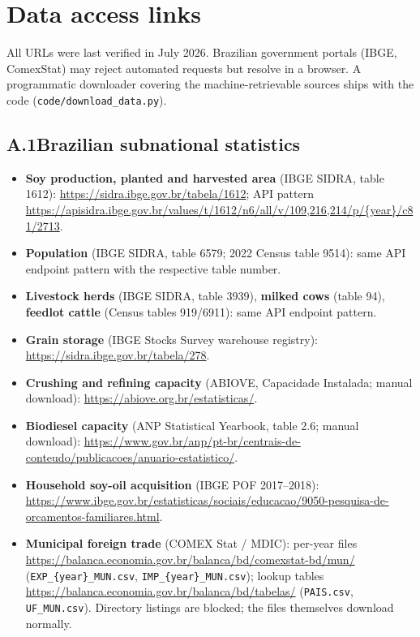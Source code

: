 
\section{Data access links}\label{app:links}

All URLs were last verified in July 2026. Brazilian government portals
(IBGE, ComexStat) may reject automated requests but resolve in a browser.
A programmatic downloader covering the machine-retrievable sources ships
with the code (\texttt{code/download\_data.py}).

\subsection*{A.1\quad Brazilian subnational statistics}
\begin{itemize}
  \item \textbf{Soy production, planted and harvested area} (IBGE SIDRA,
    table 1612): \url{https://sidra.ibge.gov.br/tabela/1612}; API pattern
    \url{https://apisidra.ibge.gov.br/values/t/1612/n6/all/v/109,216,214/p/{year}/c81/2713}.
  \item \textbf{Population} (IBGE SIDRA, table 6579; 2022 Census table
    9514): same API endpoint pattern with the respective table number.
  \item \textbf{Livestock herds} (IBGE SIDRA, table 3939), \textbf{milked
    cows} (table 94), \textbf{feedlot cattle} (Census tables 919/6911):
    same API endpoint pattern.
  \item \textbf{Grain storage} (IBGE Stocks Survey warehouse registry):
    \url{https://sidra.ibge.gov.br/tabela/278}.
  \item \textbf{Crushing and refining capacity} (ABIOVE, Capacidade
    Instalada; manual download):
    \url{https://abiove.org.br/estatisticas/}.
  \item \textbf{Biodiesel capacity} (ANP Statistical Yearbook, table 2.6;
    manual download):
    \url{https://www.gov.br/anp/pt-br/centrais-de-conteudo/publicacoes/anuario-estatistico/}.
  \item \textbf{Household soy-oil acquisition} (IBGE POF 2017--2018):
    \url{https://www.ibge.gov.br/estatisticas/sociais/educacao/9050-pesquisa-de-orcamentos-familiares.html}.
  \item \textbf{Municipal foreign trade} (COMEX Stat / MDIC):
    per-year files
    \url{https://balanca.economia.gov.br/balanca/bd/comexstat-bd/mun/}
    (\texttt{EXP\_\{year\}\_MUN.csv}, \texttt{IMP\_\{year\}\_MUN.csv});
    lookup tables
    \url{https://balanca.economia.gov.br/balanca/bd/tabelas/}
    (\texttt{PAIS.csv}, \texttt{UF\_MUN.csv}). Directory listings are
    blocked; the files themselves download normally.
\end{itemize}


